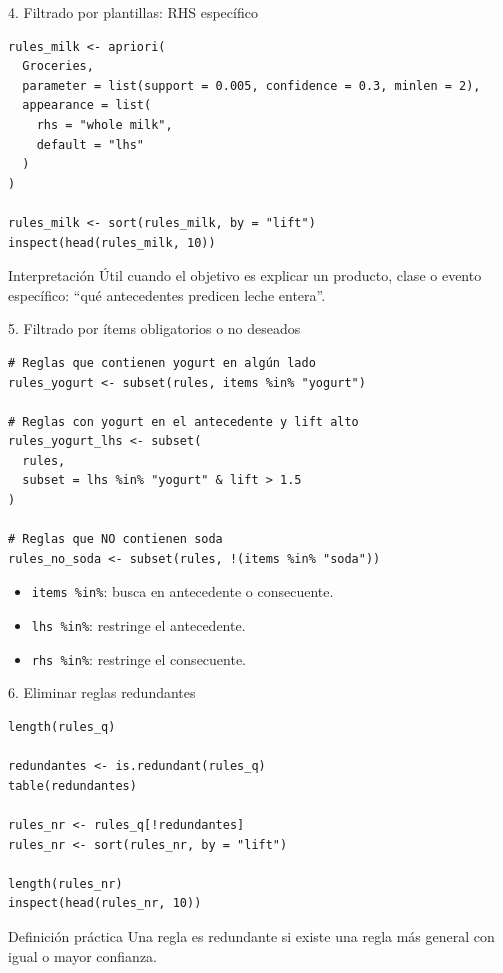 \documentclass[10pt,aspectratio=169]{beamer}
\begin{document}
\begin{frame}[fragile]{4. Filtrado por plantillas: RHS específico}
\begin{lstlisting}[style=rcode]
rules_milk <- apriori(
  Groceries,
  parameter = list(support = 0.005, confidence = 0.3, minlen = 2),
  appearance = list(
    rhs = "whole milk",
    default = "lhs"
  )
)

rules_milk <- sort(rules_milk, by = "lift")
inspect(head(rules_milk, 10))
\end{lstlisting}

\begin{block}{Interpretación}
Útil cuando el objetivo es explicar un producto, clase o evento específico: ``qué antecedentes predicen leche entera''. 
\end{block}
\end{frame}

\begin{frame}[fragile]{5. Filtrado por ítems obligatorios o no deseados}
\begin{lstlisting}[style=rcode]
# Reglas que contienen yogurt en algún lado
rules_yogurt <- subset(rules, items %in% "yogurt")

# Reglas con yogurt en el antecedente y lift alto
rules_yogurt_lhs <- subset(
  rules,
  subset = lhs %in% "yogurt" & lift > 1.5
)

# Reglas que NO contienen soda
rules_no_soda <- subset(rules, !(items %in% "soda"))
\end{lstlisting}

\begin{itemize}
  \item \texttt{items \%in\%}: busca en antecedente o consecuente.
  \item \texttt{lhs \%in\%}: restringe el antecedente.
  \item \texttt{rhs \%in\%}: restringe el consecuente.
\end{itemize}
\end{frame}

\begin{frame}[fragile]{6. Eliminar reglas redundantes}
\begin{lstlisting}[style=rcode]
length(rules_q)

redundantes <- is.redundant(rules_q)
table(redundantes)

rules_nr <- rules_q[!redundantes]
rules_nr <- sort(rules_nr, by = "lift")

length(rules_nr)
inspect(head(rules_nr, 10))
\end{lstlisting}

\begin{block}{Definición práctica}
Una regla es redundante si existe una regla más general con igual o mayor confianza.
\end{block}
\end{frame}
\end{document}
